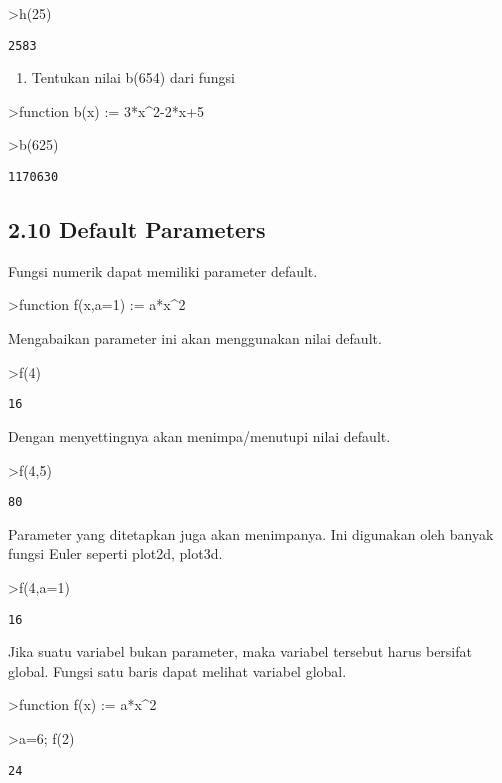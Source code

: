 \documentclass[
]{book}
\providecommand{\tightlist}{%
  \setlength{\itemsep}{0pt}\setlength{\parskip}{0pt}}
\begin{document}
\textgreater h(25)

\begin{verbatim}
2583
\end{verbatim}

\begin{enumerate}
\def\labelenumi{\arabic{enumi}.}
\setcounter{enumi}{2}
\tightlist
\item
  Tentukan nilai b(654) dari fungsi
\end{enumerate}

\textgreater function b(x) := 3*x\^{}2-2*x+5

\textgreater b(625)

\begin{verbatim}
1170630
\end{verbatim}

\subsection{2.10 Default Parameters}\label{default-parameters}

Fungsi numerik dapat memiliki parameter default.

\textgreater function f(x,a=1) := a*x\^{}2

Mengabaikan parameter ini akan menggunakan nilai default.

\textgreater f(4)

\begin{verbatim}
16
\end{verbatim}

Dengan menyettingnya akan menimpa/menutupi nilai default.

\textgreater f(4,5)

\begin{verbatim}
80
\end{verbatim}

Parameter yang ditetapkan juga akan menimpanya. Ini digunakan oleh banyak fungsi Euler seperti plot2d, plot3d.

\textgreater f(4,a=1)

\begin{verbatim}
16
\end{verbatim}

Jika suatu variabel bukan parameter, maka variabel tersebut harus bersifat global. Fungsi satu baris dapat melihat variabel global.

\textgreater function f(x) := a*x\^{}2

\textgreater a=6; f(2)

\begin{verbatim}
24
\end{verbatim}
\end{document}
